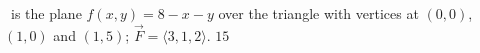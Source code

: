 {\surfaceS\ is the plane $f(x,y) = 8-x-y$ over the triangle with vertices at $(0,0)$, $(1,0)$ and $(1,5)$; $\vec F = \langle 3,1,2\rangle$.
}
{$15$
}
